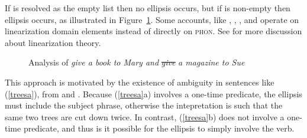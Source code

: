 \documentclass[output=paper
                ,modfonts
                ,nonflat
	        ,collection
	        ,collectionchapter
	        ,collectiontoclongg
 	        ,biblatex
                ,babelshorthands
                ,newtxmath
                ,draftmode
                ,colorlinks, citecolor=brown
]{./langsci/langscibook}
\begin{document}
{\begin{exe}
\label{lpec}
\end{exe}

\noindent
If  is resolved as the empty list then no ellipsis occurs, but if  is non-empty then ellipsis occurs, as illustrated in Figure~\ref{lpe}. 
Some accounts, like  \citet{yatabe01}, \citet{Crysmann:04}, \citet{Beavers}, and \citet{chaveslp} operate on
linearization domain\label{page-linearization-domains-in-coordination-two} elements instead of directly on \textsc{phon}.  
See  for more discussion about linearization theory.


\begin{figure}
    \centering
{}
    \caption{Analysis of \emph{give a book to Mary and} \sout{\emph{give}} \emph{a magazine to Sue}}\label{lpe}
\end{figure}

\noindent
This approach is motivated by the existence of ambiguity in 
sentences like (\ref{treesa}), from \citet{Beavers} and \citet{chaves06}. Because (\ref{treesa}a) involves a one-time predicate, the ellipsis must include the subject phrase, otherwise
the intepretation is such that the same two trees are cut down twice. In contrast,  (\ref{treesa}b) does not involve a one-time
predicate, and thus is it possible for the ellipsis to simply
involve the verb.


}
\end{document}

